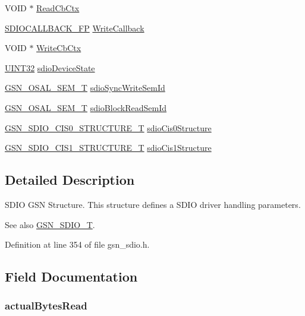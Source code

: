 \begin{DoxyCompactItemize}
VOID $\ast$ \hyperlink{a00216_ab670c794162551aa7f8c6a4103007e7b}{ReadCbCtx}
\item 
\hyperlink{a00584_ac80005f1e9ff1e1e884583938336474b}{SDIOCALLBACK\_\-FP} \hyperlink{a00216_a0d869ce47f1054167ac5c8bbd7ac6835}{WriteCallback}
\item 
VOID $\ast$ \hyperlink{a00216_aa649829459755e39af4893f8557347e5}{WriteCbCtx}
\item 
\hyperlink{a00660_gae1e6edbbc26d6fbc71a90190d0266018}{UINT32} \hyperlink{a00216_afcbed2858d28642dec8c21f42bf0ccb0}{sdioDeviceState}
\item 
\hyperlink{a00628_gab4b3554407ce22b940e2fcd3faf5fd47}{GSN\_\-OSAL\_\-SEM\_\-T} \hyperlink{a00216_a0e257037e5914a566c80658b7aece012}{sdioSyncWriteSemId}
\item 
\hyperlink{a00628_gab4b3554407ce22b940e2fcd3faf5fd47}{GSN\_\-OSAL\_\-SEM\_\-T} \hyperlink{a00216_ad60c142866b2430f69242ce7a3232d39}{sdioBlockReadSemId}
\item 
\hyperlink{a00217}{GSN\_\-SDIO\_\-CIS0\_\-STRUCTURE\_\-T} \hyperlink{a00216_a0bf26a6eea35d59f303591cd6501afa0}{sdioCis0Structure}
\item 
\hyperlink{a00218}{GSN\_\-SDIO\_\-CIS1\_\-STRUCTURE\_\-T} \hyperlink{a00216_af0ecceae9290e2a184c9f8a9b7b98240}{sdioCis1Structure}
\end{DoxyCompactItemize}


\subsection{Detailed Description}
SDIO GSN Structure. This structure defines a SDIO driver handling parameters. 

\begin{DoxySeeAlso}{See also}
\hyperlink{a00653_gadc47bf5efb9097e51608305810d29895}{GSN\_\-SDIO\_\-T}. 
\end{DoxySeeAlso}


Definition at line 354 of file gsn\_\-sdio.h.



\subsection{Field Documentation}
\hypertarget{a00216_a2bbf2fcbc8e54eea4413aa5214f4e0aa}{
\subsubsection[{actualBytesRead}]{ {\bf actualBytesRead}}}
\label{a00216_a2bbf2fcbc8e54eea4413aa5214f4e0aa}


